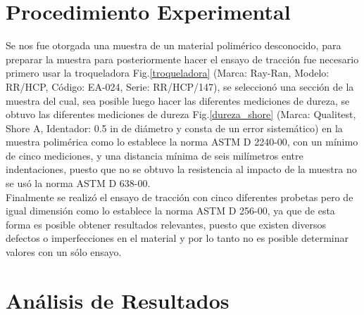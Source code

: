 \documentclass[a4paper, 11pt]{article}
\begin{document}
\section{Procedimiento Experimental}

Se nos fue otorgada una muestra de un material polimérico desconocido, para preparar la muestra para posteriormente hacer el ensayo de tracción fue necesario primero usar la troqueladora Fig.\ref{troqueladora} (Marca: Ray-Ran, Modelo: RR/HCP, Código: EA-024, Serie: RR/HCP/147), se seleccionó una sección de la muestra del cual, sea posible luego hacer las diferentes mediciones de dureza, se obtuvo las diferentes mediciones de dureza Fig.\ref{dureza_shore} (Marca: Qualitest, Shore A, Identador: 0.5 in de diámetro y consta de un error sistemático) en la muestra polimérica como lo establece la norma ASTM D 2240-00, con un mínimo de cinco mediciones, y una distancia mínima de seis milímetros entre indentaciones, puesto que no se obtuvo la resistencia al impacto de la muestra no se usó la norma ASTM D 638-00.\\

Finalmente se realizó el ensayo de tracción con cinco diferentes probetas pero de igual dimensión como lo establece la norma ASTM D 256-00, ya que de esta forma es posible obtener resultados relevantes, puesto que existen diversos defectos o imperfecciones en el material y por lo tanto no es posible determinar valores con un sólo ensayo.

\section{An\'alisis de Resultados}
\end{document}

